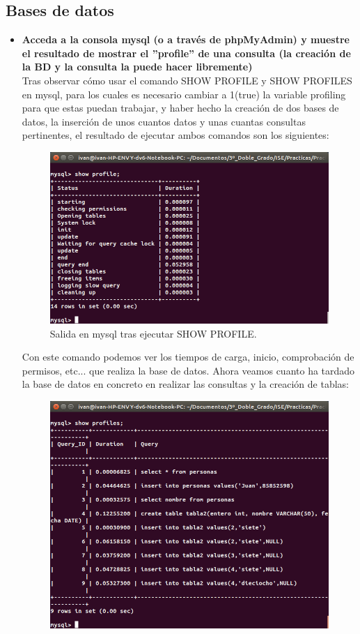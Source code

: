 \subsection{Bases de datos}

\begin{itemize}
	\item \textbf{Acceda a la consola mysql (o a través de phpMyAdmin) y muestre el
		resultado de mostrar el ”profile” de una consulta (la creación de la BD y la consulta la
		puede hacer libremente)}\\
	Tras observar cómo usar el comando SHOW PROFILE y SHOW PROFILES en mysql\cite{mysqlProfile,mysqlProfiles}, para los cuales es necesario cambiar a 1(true) la variable profiling para que estas puedan trabajar, y haber hecho la creación de dos bases de datos, la inserción de unos cuantos datos y unas cuantas consultas pertinentes, el resultado de ejecutar ambos comandos son los siguientes:\\
	\begin{figure}[H]
	\centering
	\includegraphics[width=0.7\linewidth]{mysqlProfile}
	\caption[mysqlProfile]{Salida en mysql tras ejecutar SHOW PROFILE.}
	\label{fig:mysqlProfile}
	\end{figure}
	Con este comando podemos ver los tiempos de carga, inicio, comprobación de permisos, etc... que realiza la base de datos. Ahora veamos cuanto ha tardado la base de datos en concreto en realizar las consultas y la creación de tablas:\\
	\begin{figure}[H]
	\centering
	\includegraphics[width=0.7\linewidth]{mysqlProfiles}

\end{figure}
\end{itemize}

